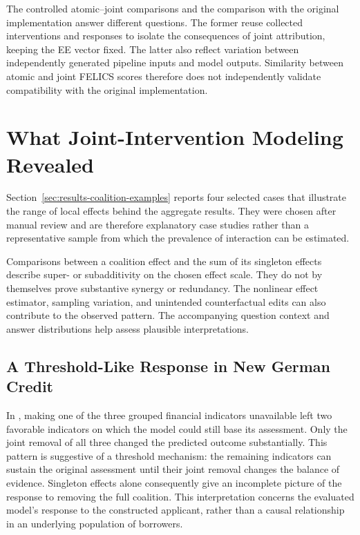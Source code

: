 The controlled atomic--joint comparisons and the comparison with the original implementation answer different questions. The former reuse collected interventions and responses to isolate the consequences of joint attribution, keeping the EE vector fixed. The latter also reflect variation between independently generated pipeline inputs and model outputs. Similarity between atomic and joint FELICS scores therefore does not independently validate compatibility with the original implementation.

\section{What Joint-Intervention Modeling Revealed}
\label{sec:joint_intervention_examples}

Section~\ref{sec:results-coalition-examples} reports four selected cases that illustrate the range of local effects behind the aggregate results. They were chosen after manual review and are therefore explanatory case studies rather than a representative sample from which the prevalence of interaction can be estimated.

Comparisons between a coalition effect and the sum of its singleton effects describe super- or subadditivity on the chosen effect scale. They do not by themselves prove substantive synergy or redundancy. The nonlinear effect estimator, sampling variation, and unintended counterfactual edits can also contribute to the observed pattern. The accompanying question context and answer distributions help assess plausible interpretations.

\subsection{A Threshold-Like Response in New German Credit}

In , making one of the three grouped financial indicators unavailable left two favorable indicators on which the model could still base its assessment. Only the joint removal of all three changed the predicted outcome substantially. This pattern is suggestive of a threshold mechanism: the remaining indicators can sustain the original assessment until their joint removal changes the balance of evidence. Singleton effects alone consequently give an incomplete picture of the response to removing the full coalition. This interpretation concerns the evaluated model's response to the constructed applicant, rather than a causal relationship in an underlying population of borrowers.

